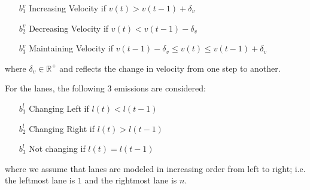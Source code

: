 \documentclass[letterpaper, 10 pt, conference]{ieeeconf}  %
\newcommand\NB[1]{$\spadesuit$\footnote{NB: #1}}
\newcommand\RP[1]{$\clubsuit$\footnote{RP: #1}}
\begin{document}

\begin{itemize}
    \item[$b_1^v$] {Increasing Velocity if $v(t) > v(t-1)+\delta_v$} 
    \item[$b_2^v$] {Decreasing Velocity if $v(t) < v(t-1)-\delta_v$}
    \item[$b_3^v$] {Maintaining Velocity if $v(t-1)-\delta_v \leq v(t) \leq v(t-1)+\delta_v$}
\end{itemize}
where $\delta_v\in\mathbb{R}^+$ and reflects the change in velocity from one step to another.

For the lanes, the following 3 emissions are considered:

\begin{enumerate}
    \item[$b_1^l$] Changing Left if $l(t) < l(t-1)$
    \item[$b_2^l$] Changing Right if $l(t) > l(t-1)$
    \item[$b_3^l$] Not changing if  $l(t) = l(t-1)$
\end{enumerate}
where we assume that lanes are modeled in increasing order from left to right; i.e. the leftmost lane is $1$ and the rightmost lane is $n$.
\end{document}
